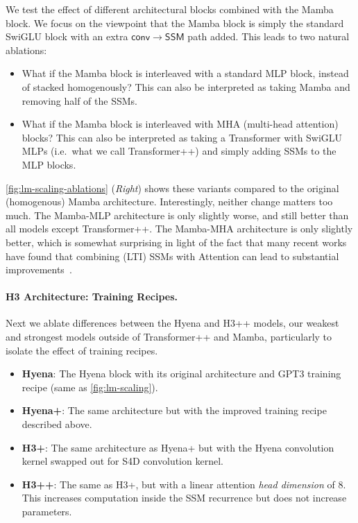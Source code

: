 We test the effect of different architectural blocks combined with the Mamba block.
We focus on the viewpoint that the Mamba block is simply the standard SwiGLU block with an extra $\mathsf{conv} \to \mathsf{SSM}$ path added.
This leads to two natural ablations:
\begin{itemize}[leftmargin=*,itemsep=0pt]
  \item What if the Mamba block is interleaved with a standard MLP block, instead of stacked homogenously? This can also be interpreted as taking Mamba and removing half of the SSMs.
  \item What if the Mamba block is interleaved with MHA (multi-head attention) blocks? This can also be interpreted as taking a Transformer with SwiGLU MLPs (i.e.\ what we call Transformer++) and simply adding SSMs to the MLP blocks.
\end{itemize}

\cref{fig:lm-scaling-ablations} (\emph{Right}) shows these variants compared to the original (homogenous) Mamba architecture.
Interestingly, neither change matters too much.
The Mamba-MLP architecture is only slightly worse, and still better than all models except Transformer++.
The Mamba-MHA architecture is only slightly better, which is somewhat surprising in light of the fact that many recent works
have found that combining (LTI) SSMs with Attention can lead to substantial improvements~\citep{dao2023hungry,fathullah2023multi,saon2023diagonal,zuo2022efficient,fathi2023block}.


\paragraph{H3 Architecture: Training Recipes.}

Next we ablate differences between the Hyena and H3++ models, our weakest and strongest models outside of Transformer++ and Mamba,
particularly to isolate the effect of training recipes.

\begin{itemize}[leftmargin=*,itemsep=0pt]
  \item \textbf{Hyena}: The Hyena block with its original architecture and GPT3 training recipe (same as \cref{fig:lm-scaling}).
  \item \textbf{Hyena+}: The same architecture but with the improved training recipe described above.
  \item \textbf{H3+}: The same architecture as Hyena+ but with the Hyena convolution kernel swapped out for S4D convolution kernel.
  \item \textbf{H3++}: The same as H3+, but with a linear attention \emph{head dimension} of 8. This increases computation inside the SSM recurrence but does not increase parameters.
\end{itemize}

